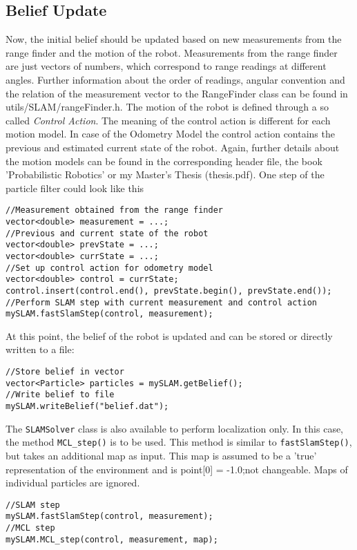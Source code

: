 \documentclass{article}
\newcommand{\SLAM}{\texttt{SLAMSolver} class }
\begin{document}
\subsection{Belief Update}
Now, the initial belief should be updated based on new measurements from the range finder and the motion of the robot. Measurements from the range finder are just vectors of numbers, which correspond to range readings at different angles. Further information about the order of readings, angular convention and the relation of the measurement vector to the RangeFinder class can be found in utils/SLAM/rangeFinder.h. The motion of the robot is defined through a so called \textit{Control Action}. The meaning of the control action is different for each motion model. In case of the Odometry Model the control action contains the previous and estimated current state of the robot. Again, further details about the motion models can be found in the corresponding header file, the book 'Probabilistic Robotics' or my Master's Thesis (thesis.pdf). One step of the particle filter could look like this
\begin{lstlisting}
//Measurement obtained from the range finder
vector<double> measurement = ...;
//Previous and current state of the robot
vector<double> prevState = ...;
vector<double> currState = ...;
//Set up control action for odometry model
vector<double> control = currState;
control.insert(control.end(), prevState.begin(), prevState.end());
//Perform SLAM step with current measurement and control action
mySLAM.fastSlamStep(control, measurement);
\end{lstlisting}
At this point, the belief of the robot is updated and can be stored or directly written to a file:
\begin{lstlisting}
//Store belief in vector
vector<Particle> particles = mySLAM.getBelief();
//Write belief to file
mySLAM.writeBelief("belief.dat");
\end{lstlisting}
The \SLAM is also available to perform localization only. In this case, the method \texttt{MCL\_step()} is to be used. This method is similar to \texttt{fastSlamStep()}, but takes an additional map as input. This map is assumed to be a 'true' representation of the environment and is point[0] = -1.0;not changeable. Maps of individual particles are ignored.
\begin{lstlisting}
//SLAM step
mySLAM.fastSlamStep(control, measurement);
//MCL step
mySLAM.MCL_step(control, measurement, map);
\end{lstlisting}
\newpage
\end{document}
